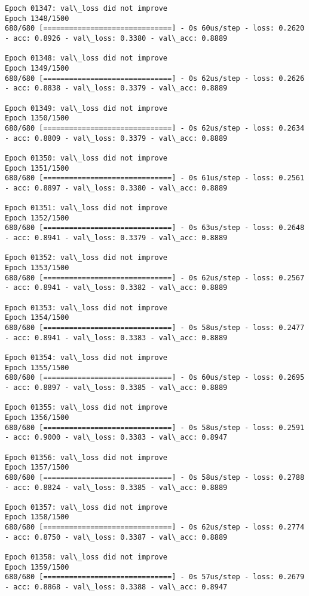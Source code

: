 \documentclass[11pt]{article}
\begin{document}
\begin{Verbatim}[commandchars=\\\{\}]
Epoch 01347: val\_loss did not improve
Epoch 1348/1500
680/680 [==============================] - 0s 60us/step - loss: 0.2620 - acc: 0.8926 - val\_loss: 0.3380 - val\_acc: 0.8889

Epoch 01348: val\_loss did not improve
Epoch 1349/1500
680/680 [==============================] - 0s 62us/step - loss: 0.2626 - acc: 0.8838 - val\_loss: 0.3379 - val\_acc: 0.8889

Epoch 01349: val\_loss did not improve
Epoch 1350/1500
680/680 [==============================] - 0s 62us/step - loss: 0.2634 - acc: 0.8809 - val\_loss: 0.3379 - val\_acc: 0.8889

Epoch 01350: val\_loss did not improve
Epoch 1351/1500
680/680 [==============================] - 0s 61us/step - loss: 0.2561 - acc: 0.8897 - val\_loss: 0.3380 - val\_acc: 0.8889

Epoch 01351: val\_loss did not improve
Epoch 1352/1500
680/680 [==============================] - 0s 63us/step - loss: 0.2648 - acc: 0.8941 - val\_loss: 0.3379 - val\_acc: 0.8889

Epoch 01352: val\_loss did not improve
Epoch 1353/1500
680/680 [==============================] - 0s 62us/step - loss: 0.2567 - acc: 0.8941 - val\_loss: 0.3382 - val\_acc: 0.8889

Epoch 01353: val\_loss did not improve
Epoch 1354/1500
680/680 [==============================] - 0s 58us/step - loss: 0.2477 - acc: 0.8941 - val\_loss: 0.3383 - val\_acc: 0.8889

Epoch 01354: val\_loss did not improve
Epoch 1355/1500
680/680 [==============================] - 0s 60us/step - loss: 0.2695 - acc: 0.8897 - val\_loss: 0.3385 - val\_acc: 0.8889

Epoch 01355: val\_loss did not improve
Epoch 1356/1500
680/680 [==============================] - 0s 58us/step - loss: 0.2591 - acc: 0.9000 - val\_loss: 0.3383 - val\_acc: 0.8947

Epoch 01356: val\_loss did not improve
Epoch 1357/1500
680/680 [==============================] - 0s 58us/step - loss: 0.2788 - acc: 0.8824 - val\_loss: 0.3385 - val\_acc: 0.8889

Epoch 01357: val\_loss did not improve
Epoch 1358/1500
680/680 [==============================] - 0s 62us/step - loss: 0.2774 - acc: 0.8750 - val\_loss: 0.3387 - val\_acc: 0.8889

Epoch 01358: val\_loss did not improve
Epoch 1359/1500
680/680 [==============================] - 0s 57us/step - loss: 0.2679 - acc: 0.8868 - val\_loss: 0.3388 - val\_acc: 0.8947


\end{Verbatim}
\end{document}
